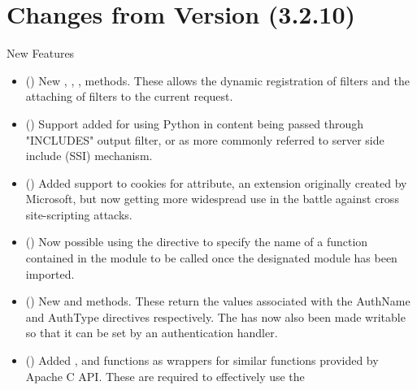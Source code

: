 \chapter{Changes from Version (3.2.10)\label{app-changes-from-3.2.10}}


  New Features

  \begin{itemize}
    \item
      ()
      New , ,
      , 
      methods. These allows the dynamic registration of filters and the
      attaching of filters to the current request.
    \item
      ()
      Support added for using Python in content being passed through "INCLUDES"
      output filter, or as more commonly referred to server side include (SSI)
      mechanism.
    \item
      ()
      Added support to cookies for  attribute, an extension
      originally created by Microsoft, but now getting more widespread use
      in the battle against cross site-scripting attacks.
    \item
      ()
      Now possible using the  directive to specify the name
      of a function contained in the module to be called once the designated
      module has been imported.
    \item
      ()
      New  and  methods.
      These return the values associated with the AuthName and AuthType
      directives respectively. The  has now also
      been made writable so that it can be set by an authentication
      handler.
    \item
      ()
      Added ,  and
       functions as wrappers for similar functions
      provided by Apache C API. These are required to effectively use the

\end{itemize}
